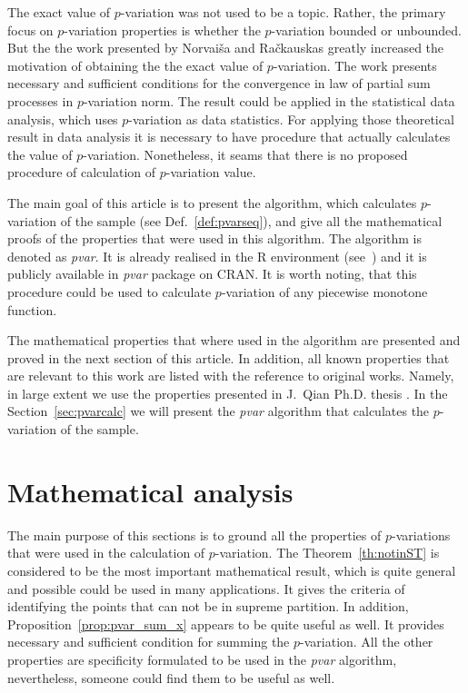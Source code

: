 \documentclass[12pt, a4paper]{article}
\numberwithin{equation}{section}
\begin{document}
  
The exact value of $p$-variation was not used to be a topic.
Rather, the primary focus on $p$-variation properties 
is whether the $p$-variation bounded or unbounded. 
But the the work \cite{NorvaisaRackauskas2008} presented by
Norvaiša and Račkauskas greatly increased the motivation
of obtaining the the exact value of $p$-variation.
The work \cite{NorvaisaRackauskas2008} presents
necessary and sufficient conditions
for the convergence in law of partial sum processes in
$p$-variation norm. 
The result could be applied in the statistical data analysis,
which uses $p$-variation as data statistics.
For applying those theoretical result in data analysis it is necessary
to have procedure that actually calculates the value of $p$-variation.
Nonetheless, it seams that there is no proposed 
procedure of calculation of $p$-variation value.

The main goal of this article is to present the algorithm,
which calculates $p$-variation of the sample
(see Def.~\ref{def:pvarseq}), and give all the mathematical proofs
of the properties that were used in this algorithm.
The algorithm is denoted as \emph{pvar}.
It is already realised in the R environment (see~\cite{R})
and it is publicly available in \emph{pvar} package on CRAN\footnotemark.
It is worth noting, that this procedure could be used to calculate
$p$-variation of any piecewise monotone function.

The mathematical properties that where used in the
algorithm are presented and proved in the next section of this article.
In addition, all known properties that are relevant to this work
are listed with the reference to original works. Namely, in large extent
we use the properties presented in J.~Qian Ph.D. thesis \cite{Qian}\footnotemark.
In the Section~\ref{sec:pvarcalc} we will present the \emph{pvar}
algorithm that calculates the $p$-variation of the sample.



\section{Mathematical analysis}



The main purpose of this sections is to 
ground all the properties of $p$-variations 
that were used in the calculation of $p$-variation.
The Theorem~\ref{th:notinST} is considered to
be the most important mathematical result,
which is quite general and possible could be used
in many applications. It gives the criteria of 
identifying the points that can not be in supreme partition.
In addition, Proposition~\ref{prop:pvar_sum_x}
appears to be quite useful as well. It provides 
necessary and sufficient condition for summing the 
$p$-variation.
All the other properties are specificity formulated 
to be used in the \emph{pvar} algorithm, nevertheless, 
someone could find them to be useful as well.
\end{document}
